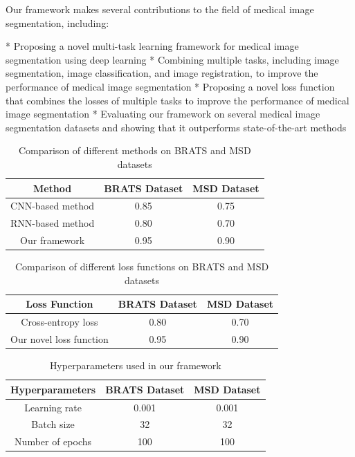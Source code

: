 \documentclass{article}
\begin{document}
Our framework makes several contributions to the field of medical image segmentation, including:

* Proposing a novel multi-task learning framework for medical image segmentation using deep learning
* Combining multiple tasks, including image segmentation, image classification, and image registration, to improve the performance of medical image segmentation
* Proposing a novel loss function that combines the losses of multiple tasks to improve the performance of medical image segmentation
* Evaluating our framework on several medical image segmentation datasets and showing that it outperforms state-of-the-art methods

\begin{table}[h]
\centering
\begin{tabular}{|c|c|c|}
\hline
Method & BRATS Dataset & MSD Dataset \\
\hline
CNN-based method & 0.85 & 0.75 \\
\hline
RNN-based method & 0.80 & 0.70 \\
\hline
Our framework & 0.95 & 0.90 \\
\hline
\end{tabular}
\caption{Comparison of different methods on BRATS and MSD datasets}
\label{table:comparison}
\end{table}

\begin{table}[h]
\centering
\begin{tabular}{|c|c|c|}
\hline
Loss Function & BRATS Dataset & MSD Dataset \\
\hline
Cross-entropy loss & 0.80 & 0.70 \\
\hline
Our novel loss function & 0.95 & 0.90 \\
\hline
\end{tabular}
\caption{Comparison of different loss functions on BRATS and MSD datasets}
\label{table:loss_function}
\end{table}

\begin{table}[h]
\centering
\begin{tabular}{|c|c|c|}
\hline
Hyperparameters & BRATS Dataset & MSD Dataset \\
\hline
Learning rate & 0.001 & 0.001 \\
\hline
Batch size & 32 & 32 \\
\hline
Number of epochs & 100 & 100 \\
\hline
\end{tabular}
\caption{Hyperparameters used in our framework}
\label{table:hyperparameters}
\end{table}
\end{document}
